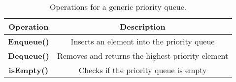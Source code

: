 
\begin{table}[t]
\centering
\scriptsize
\begin{tabular}{|c|c|}
\hline

\textbf{Operation}   & \textbf{Description}    \\ \hline

	\textbf{Enqueue()}       	& Inserts an element into the priority queue                        \\ \hline
	\textbf{Dequeue()}		& Removes and returns the highest priority element 		\\ \hline
	\textbf{isEmpty()}			& Checks if the priority queue is empty 					\\ \hline

\end{tabular}
\caption{\footnotesize{Operations for a generic priority queue}.
\label{tab:PQ_API}}
\end{table}
